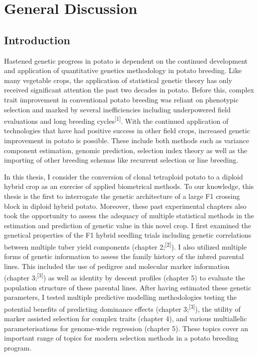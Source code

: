\chapter[General Discussion]{General Discussion}
\label{cha:Chapter6}
\newpage


\section{Introduction}\label{introduction}

Hastened genetic progress in potato is dependent on the continued
development and application of quantitative genetics methodology in
potato breeding. Like many vegetable crops, the application of
statistical genetic theory has only received significant attention the
past two decades in potato. Before this, complex trait improvement in
conventional potato breeding was reliant on phenotypic selection and
marked by several inefficiencies including underpowered field
evaluations and long breeding cycles\textsuperscript{{[}1{]}}. With the
continued application of technologies that have had positive success in
other field crops, increased genetic improvement in potato is possible.
These include both methods such as variance component estimation,
genomic prediction, selection index theory as well as the importing of
other breeding schemas like recurrent selection or line breeding.

In this thesis, I consider the conversion of clonal tetraploid potato to
a diploid hybrid crop as an exercise of applied biometrical methods. To
our knowledge, this thesis is the first to interrogate the genetic
architecture of a large F1 crossing block in diploid hybrid potato.
Moreover, these past experimental chapters also took the opportunity to
assess the adequacy of multiple statistical methods in the estimation
and prediction of genetic value in this novel crop. I first examined the
genetical properties of the F1 hybrid seedling trials including genetic
correlations between multiple tuber yield components (chapter
2;\textsuperscript{{[}2{]}}). I also utilized multiple forms of genetic
information to assess the family history of the inbred parental lines.
This included the use of pedigree and molecular marker information
(chapter 3;\textsuperscript{{[}3{]}}) as well as identity by descent
profiles (chapter 5) to evaluate the population structure of these
parental lines. After having estimated these genetic parameters, I
tested multiple predictive modelling methodologies testing the potential
benefits of predicting dominance effects (chapter
3;\textsuperscript{{[}3{]}}), the utility of marker assisted selection
for complex traits (chapter 4), and various multiallelic
parameterisations for genome-wide regression (chapter 5). These topics
cover an important range of topics for modern selection methods in a
potato breeding program.

